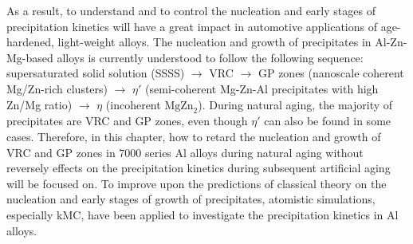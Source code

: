 As a result, to understand and to control the nucleation and early stages of precipitation kinetics will have a great impact in automotive applications of age-hardened, light-weight alloys. \cite{deschamps1998influence,banhart2011kinetics,liang2012kinetics,deschamps2014precipitation} The nucleation and growth of precipitates in Al-Zn-Mg-based alloys is currently understood to follow the following sequence: supersaturated solid solution (SSSS) $\rightarrow$ \acf{VRC} $\rightarrow$ \acf{GP} zones (nanoscale coherent Mg/Zn-rich clusters) $\rightarrow$ $\eta'$ (semi-coherent Mg-Zn-Al precipitates with high Zn/Mg ratio) $\rightarrow$ $\eta$ (incoherent $\text{MgZn}_\text{2}$). \cite{ragueneau2000review,deschamps2014precipitation,berg2001gp,chung2018transmission} During natural aging, the majority of precipitates are \ac{VRC} and \ac{GP} zones, even though $\eta'$ can also be found in some cases. \cite{mukhopadhyay1994guinier} Therefore, in this chapter, how to retard the nucleation and growth of \ac{VRC} and \ac{GP} zones in 7000 series Al alloys during natural aging without reversely effects on the precipitation kinetics during subsequent artificial aging will be focused on. To improve upon the predictions of classical theory on the nucleation and early stages of growth of precipitates, atomistic simulations, especially \ac{kMC}, have been applied to investigate the precipitation kinetics in Al alloys. \cite{clouet2006kinetic,soisson2010atomistic,soisson1996monte,liang2012kinetics,sha2005kinetic,clouet2004nucleation,vincent2008precipitation,hirosawa1998comparison,sanchez1984generalized}


